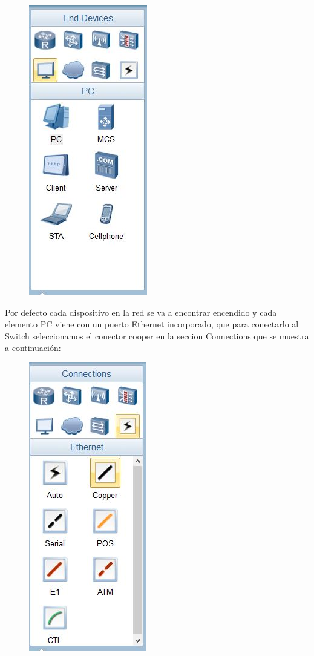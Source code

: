 \documentclass[journal]{IEEEtran}
\begin{document}
\begin{center}
\begin{figure}[H]
\centering
\includegraphics[scale=0.65]{4.JPG} 
\end{figure}
\end{center}
Por defecto cada dispositivo en la red se va a encontrar encendido y cada elemento PC viene con un puerto Ethernet incorporado, que para conectarlo al Switch seleccionamos el conector cooper en la seccion Connections que se muestra a continuación:
\begin{center}
\begin{figure}[H]
\centering
\includegraphics[scale=0.65]{5.JPG} 
\end{figure}
\end{center}
\end{document}
